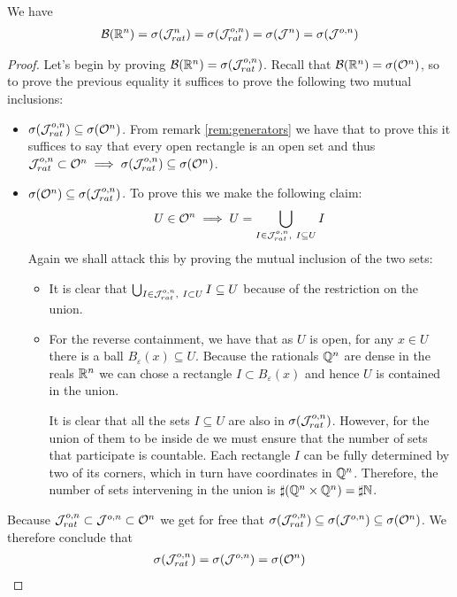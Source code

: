 \begin{thm}
	We have
	\begin{align*}
		\mathcal{B}(\mathbb{R}^n) = \sigma(\mathcal{J}_{rat}^n) = \sigma(\mathcal{J}_{rat}^{o,n}) = \sigma(\mathcal{J}^n) = \sigma(\mathcal{J}^{o,n})
	\end{align*}
	
	\begin{proof}
		Let's begin by proving $\mathcal{B}(\mathbb{R}^n) = \sigma(\mathcal{J}^{o,n}_{rat})$. Recall that $\mathcal{B}(\mathbb{R}^n) = \sigma(\mathcal{O}^n)$, so to prove the previous equality it suffices to prove the following two mutual inclusions:
		\begin{itemize}
			\item $\sigma(\mathcal{J}^{o,n}_{rat}) \subseteq \sigma(\mathcal{O}^n)$. From remark \ref{rem:generators} we have that to prove this it suffices to say that every open rectangle is an open set and thus $\mathcal{J}_{rat}^{o,n} \subset \mathcal{O}^n \implies \sigma(\mathcal{J}^{o,n}_{rat}) \subseteq \sigma(\mathcal{O}^n)$.
			\item $\sigma(\mathcal{O}^n) \subseteq \sigma(\mathcal{J}^{o,n}_{rat})$. To prove this we make the following claim:
			\begin{align*}
				U \in \mathcal{O}^n \implies U = \bigcup_{I \in \mathcal{J}_{rat}^{o,n},\ I \subseteq U} I
			\end{align*}
			Again we shall attack this by proving the mutual inclusion of the two sets:
			\begin{itemize}
				\item It is clear that $\bigcup_{I \in \mathcal{J}_{rat}^{o,n},\ I \subset U} I \subseteq U$ because of the restriction on the union.
				\item For the reverse containment, we have that as $U$ is open, for any $x \in U$ there is a ball $B_\varepsilon(x) \subseteq U$. Because the rationals $\mathbb{Q}^n$ are dense in the reals $\mathbb{R}^n$ we can chose a rectangle $I \subset B_\varepsilon(x)$ and hence $U$ is contained in the union.
				
				It is clear that all the sets $I \subseteq U$ are also in $\sigma(\mathcal{J}_{rat}^{o,n})$. However, for the union of them to be inside de \siga we must ensure that the number of sets that participate is countable. Each rectangle $I$ can be fully determined by two of its corners, which in turn have coordinates in $\mathbb{Q}^n$. Therefore, the number of sets intervening in the union is $\sharp (\mathbb{Q}^n \times \mathbb{Q}^n) = \sharp \mathbb{N}$.
			\end{itemize}
		\end{itemize}
	
		Because $\mathcal{J}_{rat}^{o,n} \subset \mathcal{J}^{o,n} \subset \mathcal{O}^n$ we get for free that $\sigma(\mathcal{J}_{rat}^{o,n}) \subseteq \sigma(\mathcal{J}^{o,n}) \subseteq \sigma(\mathcal{O}^n)$. We therefore conclude that
		\begin{align*}
			\sigma(\mathcal{J}_{rat}^{o,n}) = \sigma(\mathcal{J}^{o,n}) = \sigma(\mathcal{O}^n)
		\end{align*}
		

\end{proof}
\end{thm}
